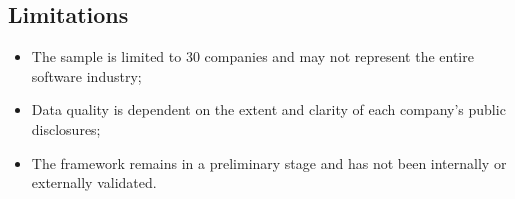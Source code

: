 \subsection{Limitations}
\begin{itemize}
    \item The sample is limited to 30 companies and may not represent the entire software industry;
    \item Data quality is dependent on the extent and clarity of each company’s public disclosures;
    \item The framework remains in a preliminary stage and has not been internally or externally validated.
\end{itemize}